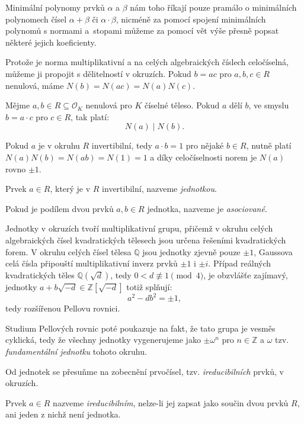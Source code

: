 \documentclass[12pt]{report}
\begin{document}
Minimální polynomy prvků $\alpha$ a $\beta$ nám toho říkají pouze pramálo o minimálních polynomech čísel $\alpha+\beta$ či $\alpha \cdot \beta$, nicméně za pomocí spojení minimálních polynomů s normami a~stopami můžeme za pomocí vět výše přesně popsat některé jejich koeficienty.

Protože je norma multiplikativní a na celých algebraických číslech celočíselná, můžeme ji propojit s dělitelností v okruzích. Pokud $b = ac$ pro $a,b,c \in R$ nenulová, máme $N(b) = N(ac) = N(a)N(c)$.
\begin{veta}\label{normalni}
Mějme $a,b \in R \subseteq \mathcal{O}_K$ nenulová pro $K$ číselné těleso. Pokud $a$ dělí $b$, ve smyslu $b = a \cdot c$ pro $c \in R$, tak platí:
\begin{equation*}
N(a) \mid N(b).
\end{equation*}
\end{veta}

Pokud $a$ je v okruhu $R$ invertibilní, tedy $a\cdot b = 1$ pro nějaké $b \in R$, nutně platí $N(a)N(b) = N(ab) = N(1) = 1$ a díky celočíselnosti norem je $N(a)$ rovno $\pm 1$. 
\begin{definice}
Prvek $a \in R$, který je v $R$ invertibilní, nazveme \textit{jednotkou}.
\end{definice}

\begin{definice}
Pokud je podílem dvou prvků $a,b \in R$ jednotka, nazveme je \textit{asociované}.
\end{definice}

Jednotky v okruzích tvoří multiplikativní grupu, přičemž v okruhu celých algebraických čísel kvadratických tělesech jsou určena řešeními kvadratických forem. V okruhu celých čísel tělesa $\mathbb{Q}$ jsou jednotky zjevně pouze $\pm 1$, Gaussova celá čísla připouští multiplikativní inverz prvků $\pm 1$ i $\pm i$. Případ reálných kvadratických těles $\mathbb{Q}(\sqrt{d})$, tedy $0 < d \not\equiv 1 \pmod{4}$, je obzvlášťe zajímavý, jednotky $a+b\sqrt{-d} \in \mathbb{Z}[\sqrt{-d}]$ totiž splňují:
\begin{equation*}
a^2 - d b^2 = \pm 1,
\end{equation*}
tedy rozšířenou Pellovu rovnici.

Studium Pellových rovnic \cite[2. díl]{Prase} poté poukazuje na fakt, že tato grupa je vesměs cyklická, tedy že všechny jednotky vygenerujeme jako $\pm \omega^n$ pro $n \in \mathbb{Z}$ a $\omega$ tzv. \textit{fundamentální jednotku} tohoto okruhu.

Od jednotek se přesuňme na zobecnění prvočísel, tzv. \textit{ireducibilních} prvků, v okruzích. 
\begin{definice}
Prvek $a \in R$ nazveme \textit{ireducibilním}, nelze-li jej zapsat jako součin dvou prvků $R$, ani jeden z nichž není jednotka.
\end{definice}
\end{document}
